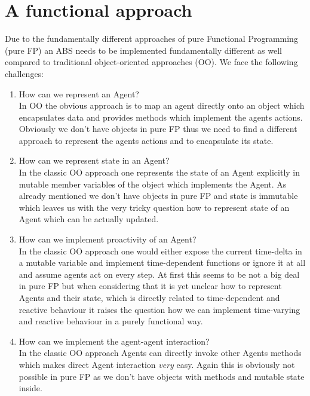 \section{A functional approach}
Due to the fundamentally different approaches of pure Functional Programming (pure FP) an ABS needs to be implemented fundamentally different as well compared to traditional object-oriented approaches (OO). We face the following challenges:

\begin{enumerate}
	\item How can we represent an Agent? \\
	In OO the obvious approach is to map an agent directly onto an object which encapsulates data and provides methods which implement the agents actions. Obviously we don't have objects in pure FP thus we need to find a different approach to represent the agents actions and to encapsulate its state.
	
	\item How can we represent state in an Agent? \\
	In the classic OO approach one represents the state of an Agent explicitly in mutable member variables of the object which implements the Agent. As already mentioned we don't have objects in pure FP and state is immutable which leaves us with the very tricky question how to represent state of an Agent which can be actually updated.
	
	\item How can we implement proactivity of an Agent? \\
	In the classic OO approach one would either expose the current time-delta in a mutable variable and implement time-dependent functions or ignore it at all and assume agents act on every step. At first this seems to be not a big deal in pure FP but when considering that it is yet unclear how to represent Agents and their state, which is directly related to time-dependent and reactive behaviour it raises the question how we can implement time-varying and reactive behaviour in a purely functional way.
	
	\item How can we implement the agent-agent interaction? \\
	In the classic OO approach Agents can directly invoke other Agents methods which makes direct Agent interaction \textit{very} easy. Again this is obviously not possible in pure FP as we don't have objects with methods and mutable state inside.
		

\end{enumerate}
